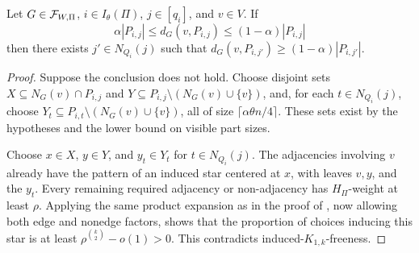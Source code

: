 \begin{lemma}\label{lemma:deterministic-medium-companion-K1k}
Let $G\in{\mathcal F}_{W,\Pi}$, $i\in I_\theta(\Pi)$, $j\in[q_i]$, and $v\in V$. If
$$\alpha |P_{i,j}|\leq d_G(v,P_{i,j})\leq(1-\alpha)|P_{i,j}|$$
then there exists $j'\in N_{Q_i}(j)$ such that $d_G(v,P_{i,j'})\geq(1-\alpha)|P_{i,j'}|$.
\end{lemma}
\begin{proof}
Suppose the conclusion does not hold. Choose disjoint sets $X\subseteq N_G(v)\cap P_{i,j}$ and $Y\subseteq P_{i,j}\setminus(N_G(v)\cup\{v\})$, and, for each $t\in N_{Q_i}(j)$, choose $Y_t\subseteq P_{i,t}\setminus(N_G(v)\cup\{v\})$, all of size $\lceil\alpha\theta n/4\rceil$. These sets exist by the hypotheses and the lower bound on visible part sizes.

Choose $x\in X$, $y\in Y$, and $y_t\in Y_t$ for $t\in N_{Q_i}(j)$. The adjacencies involving $v$ already have the pattern of an induced star centered at $x$, with leaves $v,y$, and the $y_t$. Every remaining required adjacency or non-adjacency has $H_\Pi$-weight at least $\rho$. Applying the same product expansion as in the proof of , now allowing both edge and nonedge factors, shows that the proportion of choices inducing this star is at least $\rho^{\binom{k}{2}}-o(1)>0$. This contradicts induced-$K_{1,k}$-freeness.
\end{proof}

